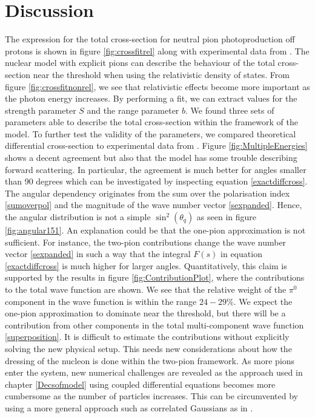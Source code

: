 \section{Discussion}\label{sec:discussion}
The expression for the total cross-section for neutral pion photoproduction off protons is shown in figure \ref{fig:crossfitrel} along with experimental data from \cite{Schmidt_2001}. The nuclear model with explicit pions can describe the behaviour of the total cross-section near the threshold when using the relativistic density of states. From figure \ref{fig:crossfitnonrel}, we see that relativistic effects become more important as the photon energy increases. By performing a fit, we can extract values for the strength parameter $S$ and the range parameter $b$. We found three sets of parameters able to describe the total cross-section within the framework of the model. To further test the validity of the parameters, we compared theoretical differential cross-section to experimental data from \cite{BeckPion}. Figure \ref{fig:MultipleEnergies} shows a decent agreement but also that the model has some trouble describing forward scattering. In particular, the agreement is much better for angles smaller than 90 degrees which can be investigated by inspecting equation \eqref{exactdiffcross}. The angular dependency originates from the sum over the polarisation index \eqref{sumoverpol} and the magnitude of the wave number vector \eqref{sexpanded}. Hence, the angular distribution is not a simple $\sin^2(\theta_q)$ as seen in figure \ref{fig:angular151}. An explanation could be that the one-pion approximation is not sufficient. For instance, the two-pion contributions change the wave number vector \eqref{sexpanded} in such a way that the integral $F(s)$ in equation \eqref{exactdiffcross} is much higher for larger angles. Quantitatively, this claim is supported by the results in figure \ref{fig:ContributionPlot}, where the contributions to the total wave function are shown. We see that the relative weight of the $\pi^0$ component in the wave function is within the range $24-29\%$. We expect the one-pion approximation to dominate near the threshold, but there will be a contribution from other components in the total multi-component wave function \eqref{superposition}. It is difficult to estimate the contributions without explicitly solving the new physical setup. This needs new considerations about how the dressing of the nucleon is done within the two-pion framework. As more pions enter the system, new numerical challenges are revealed as the approach used in chapter \ref{Decsofmodel} using coupled differential equations becomes more cumbersome as the number of particles increases. This can be circumvented by using a more general approach such as correlated Gaussians as in \cite{Fedorov2020}. 

